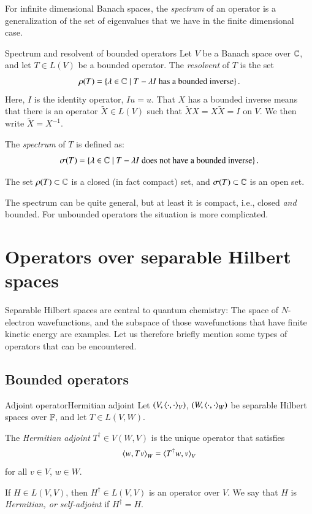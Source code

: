 For infinite dimensional Banach spaces, the \emph{spectrum} of an operator is a generalization of the 
set of eigenvalues that we have in the finite dimensional case.
\begin{myDefinition}{Spectrum and resolvent of bounded operators}{}
    Let $V$ be a Banach space over $\mathbb{C}$, and let $T \in L(V)$ be a bounded operator. The \emph{resolvent} of $T$ is the set
    \begin{equation}
        \rho(T) = \left\{ \lambda \in \mathbb{C} \mid T - \lambda I \; \text{has a bounded inverse} \right\}.
    \end{equation}
    Here, $I$ is the identity operator, $Iu = u$. That $X$ has a bounded inverse means that there is an operator $\tilde{X}\in L(V)$ such that $\tilde{X}X = X\tilde{X} = I$ on $V$. We then write $\tilde{X} = X^{-1}$.

    The \emph{spectrum} of $T$ is defined as:
    \begin{equation}
        \sigma(T) = \left\{ \lambda \in \mathbb{C} \mid T - \lambda I \; \text{does not have a bounded inverse} \right\}.
    \end{equation}

    The set $\rho(T)\subset\mathbb{C}$ is a closed (in fact compact) set, and $\sigma(T)\subset \mathbb{C}$ is an open set.
\end{myDefinition}

The spectrum can be quite general, but at least it is compact, i.e., closed \emph{and} bounded. For unbounded operators the situation is more complicated.


\section{Operators over separable Hilbert spaces}
\label{sec:operators over hilbert space}

Separable Hilbert spaces are central to quantum chemistry: The space of $N$-electron wavefunctions, and the subspace of those wavefunctions that have finite kinetic energy are examples. Let us therefore briefly mention some types of operators that can be encountered.

\subsection{Bounded operators}

\begin{myDefinition}{Adjoint operator}{Hermitian adjoint}
    Let $(V,\braket{\cdot,\cdot}_V)$, $(W,\braket{\cdot,\cdot}_W)$ be separable Hilbert spaces over $\mathbb{F}$, and let $T \in L(V,W)$.
    
    The \emph{Hermitian adjoint} $T^\dag \in V(W,V)$ is the unique operator that satisfies
    $$ \braket{w,Tv}_W = \braket{T^\dag w,v}_V $$
    for all $v\in V$, $w \in W$.

    If $H \in L(V,V)$, then $H^\dag \in L(V,V)$ is an operator over $V$. We say that $H$ is \emph{Hermitian, or self-adjoint} if $H^\dag = H$.
\end{myDefinition}


